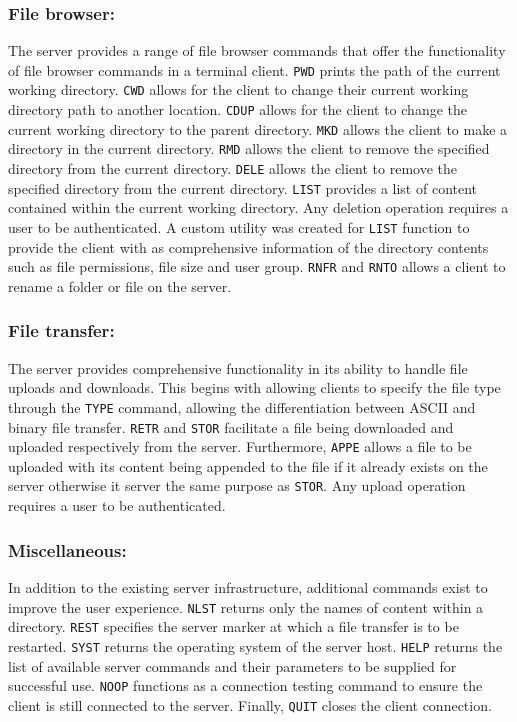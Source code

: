 \documentclass[10pt,twocolumn]{witseiepaper}
\begin{document}
\subsubsection*{File browser:}
The server provides a range of file browser commands that offer the functionality of file browser commands in a terminal client. \texttt{PWD} prints the path of the current working directory. \texttt{CWD} allows for the client to change their current working directory path to another location. \texttt{CDUP} allows for the client to change the current working directory to the parent directory. \texttt{MKD} allows the client to make a directory in the current directory. \texttt{RMD} allows the client to remove the specified directory from the current directory. \texttt{DELE} allows the client to remove the specified directory from the current directory. \texttt{LIST} provides a list of content contained within the current working directory. Any deletion operation requires a user to be authenticated. A custom utility was created for \texttt{LIST} function to provide the client with as comprehensive information of the directory contents such as file permissions, file size and user group. \texttt{RNFR} and \texttt{RNTO} allows a client to rename a folder or file on the server.

\subsubsection*{File transfer:}
The server provides comprehensive functionality in its ability to handle file uploads and downloads. This begins with allowing clients to specify the file type through the \texttt{TYPE} command, allowing the differentiation between ASCII and binary file transfer. \texttt{RETR} and \texttt{STOR} facilitate a file being downloaded and uploaded respectively from the server. Furthermore, \texttt{APPE} allows a file to be uploaded with its content being appended to the file if it already exists on the server otherwise it server the same purpose as \texttt{STOR}. Any upload operation requires a user to be authenticated.

\subsubsection*{Miscellaneous:}
In addition to the existing server infrastructure, additional commands exist to improve the user experience. \texttt{NLST} returns only the names of content within a directory. \texttt{REST} specifies the server marker at which a file transfer is to be restarted. \texttt{SYST} returns the operating system of the server host. \texttt{HELP} returns the list of available server commands and their parameters to be supplied for successful use. \texttt{NOOP} functions as a connection testing command to ensure the client is still connected to the server. Finally, \texttt{QUIT} closes the client connection.
\end{document}
